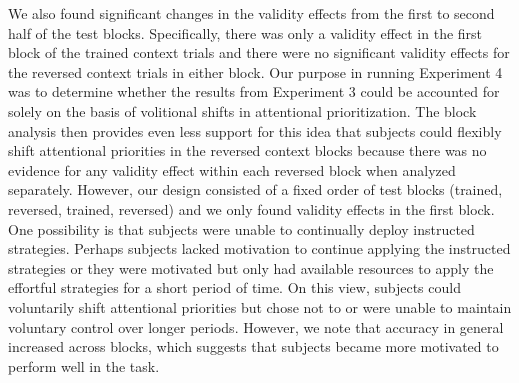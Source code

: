 \documentclass[english,,man,floatsintext]{apa6}
\begin{document}
We also found significant changes in the validity effects from the first
to second half of the test blocks. Specifically, there was only a
validity effect in the first block of the trained context trials and
there were no significant validity effects for the reversed context
trials in either block. Our purpose in running Experiment 4 was to
determine whether the results from Experiment 3 could be accounted for
solely on the basis of volitional shifts in attentional prioritization.
The block analysis then provides even less support for this idea that
subjects could flexibly shift attentional priorities in the reversed
context blocks because there was no evidence for any validity effect
within each reversed block when analyzed separately. However, our design
consisted of a fixed order of test blocks (trained, reversed, trained,
reversed) and we only found validity effects in the first block. One
possibility is that subjects were unable to continually deploy
instructed strategies. Perhaps subjects lacked motivation to continue
applying the instructed strategies or they were motivated but only had
available resources to apply the effortful strategies for a short period
of time. On this view, subjects could voluntarily shift attentional
priorities but chose not to or were unable to maintain voluntary control
over longer periods. However, we note that accuracy in general increased
across blocks, which suggests that subjects became more motivated to
perform well in the task.
\end{document}
